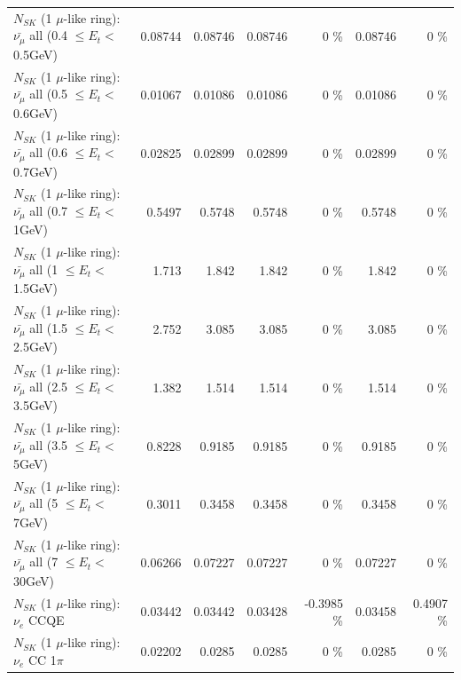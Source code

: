 \begin{table}
\begin{tabular}{| l | r | r | r  r | r  r |}
 $N_{SK}$ (1 $\mu$-like ring): $\bar{\nu_{\mu}}$ all (0.4 $\leq E_{t} <$ 0.5GeV) &         0.08744 &         0.08746 &         0.08746 &        0 \%  &         0.08746 &        0 \%  \\ 
 $N_{SK}$ (1 $\mu$-like ring): $\bar{\nu_{\mu}}$ all (0.5 $\leq E_{t} <$ 0.6GeV) &         0.01067 &         0.01086 &         0.01086 &        0 \%  &         0.01086 &        0 \%  \\ 
 $N_{SK}$ (1 $\mu$-like ring): $\bar{\nu_{\mu}}$ all (0.6 $\leq E_{t} <$ 0.7GeV) &         0.02825 &         0.02899 &         0.02899 &        0 \%  &         0.02899 &        0 \%  \\ 
   $N_{SK}$ (1 $\mu$-like ring): $\bar{\nu_{\mu}}$ all (0.7 $\leq E_{t} <$ 1GeV) &          0.5497 &          0.5748 &          0.5748 &        0 \%  &          0.5748 &        0 \%  \\ 
   $N_{SK}$ (1 $\mu$-like ring): $\bar{\nu_{\mu}}$ all (1 $\leq E_{t} <$ 1.5GeV) &           1.713 &           1.842 &           1.842 &        0 \%  &           1.842 &        0 \%  \\ 
 $N_{SK}$ (1 $\mu$-like ring): $\bar{\nu_{\mu}}$ all (1.5 $\leq E_{t} <$ 2.5GeV) &           2.752 &           3.085 &           3.085 &        0 \%  &           3.085 &        0 \%  \\ 
 $N_{SK}$ (1 $\mu$-like ring): $\bar{\nu_{\mu}}$ all (2.5 $\leq E_{t} <$ 3.5GeV) &           1.382 &           1.514 &           1.514 &        0 \%  &           1.514 &        0 \%  \\ 
   $N_{SK}$ (1 $\mu$-like ring): $\bar{\nu_{\mu}}$ all (3.5 $\leq E_{t} <$ 5GeV) &          0.8228 &          0.9185 &          0.9185 &        0 \%  &          0.9185 &        0 \%  \\ 
     $N_{SK}$ (1 $\mu$-like ring): $\bar{\nu_{\mu}}$ all (5 $\leq E_{t} <$ 7GeV) &          0.3011 &          0.3458 &          0.3458 &        0 \%  &          0.3458 &        0 \%  \\ 
    $N_{SK}$ (1 $\mu$-like ring): $\bar{\nu_{\mu}}$ all (7 $\leq E_{t} <$ 30GeV) &         0.06266 &         0.07227 &         0.07227 &        0 \%  &         0.07227 &        0 \%  \\ 
\hline
\hline
\hline
                                      $N_{SK}$ (1 $\mu$-like ring): $\nu_e$ CCQE &         0.03442 &         0.03442 &         0.03428 &  -0.3985 \%  &         0.03458 &   0.4907 \%  \\ 
                                 $N_{SK}$ (1 $\mu$-like ring): $\nu_e$ CC 1$\pi$ &         0.02202 &          0.0285 &          0.0285 &        0 \%  &          0.0285 &        0 \%  \\ 

\end{tabular}
\end{table}
